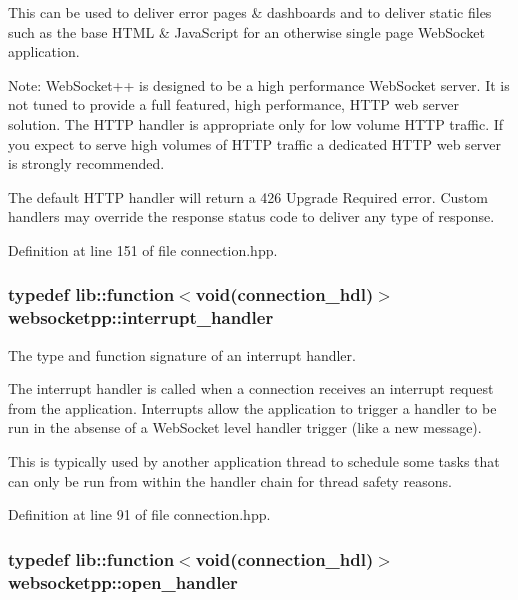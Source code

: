 This can be used to deliver error pages \& dashboards and to deliver static files such as the base H\+T\+ML \& Java\+Script for an otherwise single page Web\+Socket application.

Note\+: Web\+Socket++ is designed to be a high performance Web\+Socket server. It is not tuned to provide a full featured, high performance, H\+T\+TP web server solution. The H\+T\+TP handler is appropriate only for low volume H\+T\+TP traffic. If you expect to serve high volumes of H\+T\+TP traffic a dedicated H\+T\+TP web server is strongly recommended.

The default H\+T\+TP handler will return a 426 Upgrade Required error. Custom handlers may override the response status code to deliver any type of response. 

Definition at line 151 of file connection.\+hpp.

\subsubsection[{\texorpdfstring{interrupt\+\_\+handler}{interrupt\_handler}}]{\setlength{\rightskip}{0pt plus 5cm}typedef lib\+::function$<$void({\bf connection\+\_\+hdl})$>$ {\bf websocketpp\+::interrupt\+\_\+handler}}\hypertarget{namespacewebsocketpp_a55f6947df7673a9de3c44b6bd5d4a82a}{}\label{namespacewebsocketpp_a55f6947df7673a9de3c44b6bd5d4a82a}


The type and function signature of an interrupt handler. 

The interrupt handler is called when a connection receives an interrupt request from the application. Interrupts allow the application to trigger a handler to be run in the absense of a Web\+Socket level handler trigger (like a new message).

This is typically used by another application thread to schedule some tasks that can only be run from within the handler chain for thread safety reasons. 

Definition at line 91 of file connection.\+hpp.

\subsubsection[{\texorpdfstring{open\+\_\+handler}{open\_handler}}]{\setlength{\rightskip}{0pt plus 5cm}typedef lib\+::function$<$void({\bf connection\+\_\+hdl})$>$ {\bf websocketpp\+::open\+\_\+handler}}\hypertarget{namespacewebsocketpp_a53c8b4ae59cf13b5f883b119bbd14d72}{}\label{namespacewebsocketpp_a53c8b4ae59cf13b5f883b119bbd14d72}


